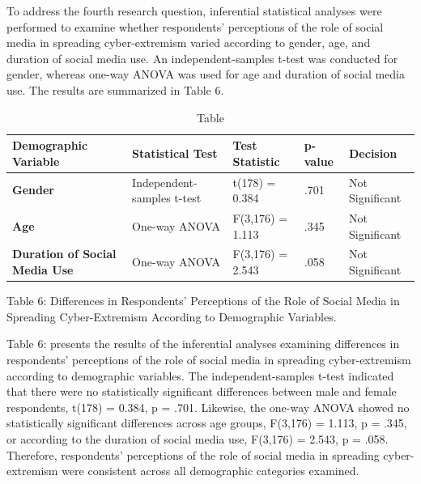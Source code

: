 \documentclass{NSP1}
\begin{document}
\par\vspace{5.0pt}\vspace{5.0pt}

To address the fourth research question, inferential statistical analyses were performed to examine whether respondents' perceptions of the role of social media in spreading cyber-extremism varied according to gender, age, and duration of social media use. An independent-samples t-test was conducted for gender, whereas one-way ANOVA was used for age and duration of social media use. The results are summarized in Table 6.

\begin{table}[tbp]
\centering
{\small
\begin{tabular}{|>{\centering\arraybackslash}p{}|>{\centering\arraybackslash}p{}|>{\centering\arraybackslash}p{}|p{}|>{\centering\arraybackslash}p{}|}
\hline
\cellcolor[HTML]{DDD9C3}\textbf{Demographic Variable} & \cellcolor[HTML]{DDD9C3}\textbf{Statistical Test} & \cellcolor[HTML]{DDD9C3}\textbf{Test Statistic} & \cellcolor[HTML]{DDD9C3}\textbf{p-value} & \cellcolor[HTML]{DDD9C3}\textbf{Decision} \\
\hline
\cellcolor[HTML]{DDD9C3}\textbf{Gender} & Independent-samples t-test & t(178) = 0.384 & .701 & Not Significant \\
\hline
\cellcolor[HTML]{DDD9C3}\textbf{Age} & One-way ANOVA & F(3,176) = 1.113 & .345 & Not Significant \\
\hline
\cellcolor[HTML]{DDD9C3}\textbf{Duration of Social Media Use} & One-way ANOVA & F(3,176) = 2.543 & .058 & Not Significant \\
\hline
\end{tabular}}
\caption{Table}

\end{table}

Table 6: Differences in Respondents' Perceptions of the Role of Social Media in Spreading Cyber-Extremism According to Demographic Variables.

Table 6: presents the results of the inferential analyses examining differences in respondents' perceptions of the role of social media in spreading cyber-extremism according to demographic variables. The independent-samples t-test indicated that there were no statistically significant differences between male and female respondents, t(178) = 0.384, p = .701. Likewise, the one-way ANOVA showed no statistically significant differences across age groups, F(3,176) = 1.113, p = .345, or according to the duration of social media use, F(3,176) = 2.543, p = .058. Therefore, respondents' perceptions of the role of social media in spreading cyber-extremism were consistent across all demographic categories examined.
\end{document}
